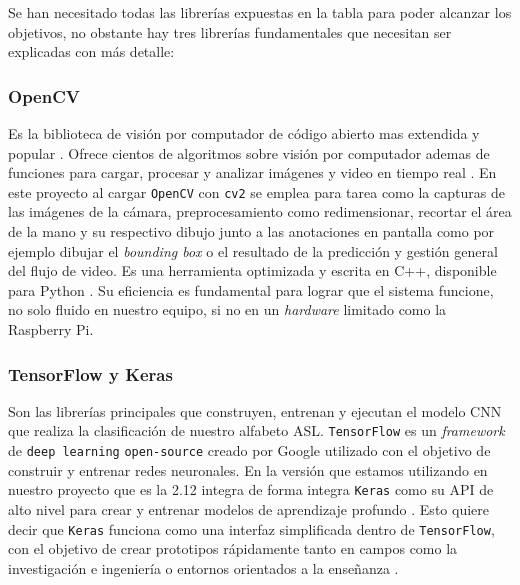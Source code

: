 Se han necesitado todas las librerías expuestas en la tabla para poder alcanzar los objetivos, no obstante hay tres librerías fundamentales que necesitan ser explicadas con más detalle:

\subsubsection{OpenCV}


 Es la biblioteca de visión por computador de código abierto mas extendida y popular \cite{web:opencv}. Ofrece cientos de algoritmos sobre visión por computador ademas de funciones para cargar, procesar y analizar imágenes y video en tiempo real \cite{web:opencv_doc}. En este proyecto al cargar \texttt{OpenCV} con \texttt{cv2} se emplea para tarea como la capturas de las imágenes de la cámara, preprocesamiento como redimensionar, recortar el área de la mano y su respectivo dibujo junto a las anotaciones en pantalla como por ejemplo dibujar el \textit{bounding box} o el resultado de la predicción y gestión general del flujo de video. Es una herramienta optimizada y escrita en C++, disponible para Python \cite{web:opencv}\cite{web:opencv_doc}. Su eficiencia es fundamental para lograr que el sistema funcione, no solo fluido en nuestro equipo, si no en un \textit{hardware} limitado como la Raspberry Pi.
 
\subsubsection{TensorFlow y Keras}


Son las librerías principales que construyen, entrenan y ejecutan el modelo CNN que realiza la clasificación de nuestro alfabeto ASL. \texttt{TensorFlow} es un \textit{framework} de \texttt{deep learning} \texttt{open-source} creado por Google utilizado con el objetivo de construir y entrenar redes neuronales. En la versión que estamos utilizando en nuestro proyecto que es la 2.12 integra de forma integra \texttt{Keras} como su API de alto nivel para crear y entrenar modelos de aprendizaje profundo \cite{web:tf_keras}. Esto quiere decir que \texttt{Keras} funciona como una interfaz simplificada dentro de \texttt{TensorFlow}, con el objetivo de crear prototipos rápidamente tanto en campos como la investigación e ingeniería o entornos orientados a la enseñanza \cite{web:tf_keras}.

